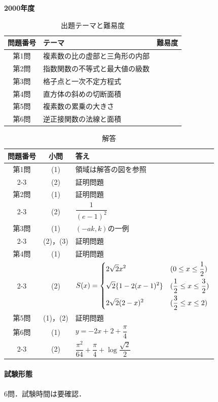 \documentclass[../../main.tex]{subfiles}
\begin{document}
\begin{center}
  {\fontsize{48pt}{58pt}\selectfont \textbf{2000}\normalsize\textbf{年度}}
\end{center}

\begin{table}[htb]
  \centering
  \caption{出題テーマと難易度}
  \begin{tabular}{|c|p{9cm}|c|}
    \hline
    \textbf{問題番号} & \textbf{テーマ} & \textbf{難易度} \\
    \hline
    第1問 & 複素数の比の虚部と三角形の内部 & \\
    \hline
    第2問 & 指数関数の不等式と最大値の級数 & \\
    \hline
    第3問 & 格子点と一次不定方程式 & \\
    \hline
    第4問 & 直方体の斜めの切断面積 & \\
    \hline
    第5問 & 複素数の累乗の大きさ & \\
    \hline
    第6問 & 逆正接関数の法線と面積 & \\
    \hline
  \end{tabular}
\end{table}

\begin{table}[htb]
  \centering
  \caption{解答}
  \renewcommand{\arraystretch}{1.4}
  \begin{tabular}{|c|c|p{9cm}|}
    \hline
    \textbf{問題番号} & \textbf{小問} & \textbf{答え} \\
    \hline
    第1問 & (1) & 領域は解答の図を参照 \\
    \cline{2-3}
    & (2) & 証明問題 \\
    \hline
    第2問 & (1) & 証明問題 \\
    \cline{2-3}
    & (2) & $\dfrac{1}{(e-1)^2}$ \\
    \hline
    第3問 & (1) & $(-ak,k)$の一例 \\
    \cline{2-3}
    & (2)，(3) & 証明問題 \\
    \hline
    第4問 & (1) & 証明問題 \\
    \cline{2-3}
    & (2) & $S(x)=
    \begin{dcases}2\sqrt{2}x^2&(0\le x\le\dfrac{1}{2})\\ \sqrt{2}\{1-2(x-1)^2\}&(\dfrac{1}{2}\le x\le\dfrac{3}{2})\\ 2\sqrt{2}(2-x)^2&(\dfrac{3}{2}\le x\le2)
    \end{dcases}$ \\
    \hline
    第5問 & (1)，(2) & 証明問題 \\
    \hline
    第6問 & (1) & $y=-2x+2+\dfrac{\pi}{4}$ \\
    \cline{2-3}
    & (2) & $\dfrac{\pi^2}{64}+\dfrac{\pi}{4}+\log\dfrac{\sqrt{2}}{2}$ \\
    \hline
  \end{tabular}
\end{table}

\paragraph{試験形態}
6問．試験時間は要確認．
\end{document}
